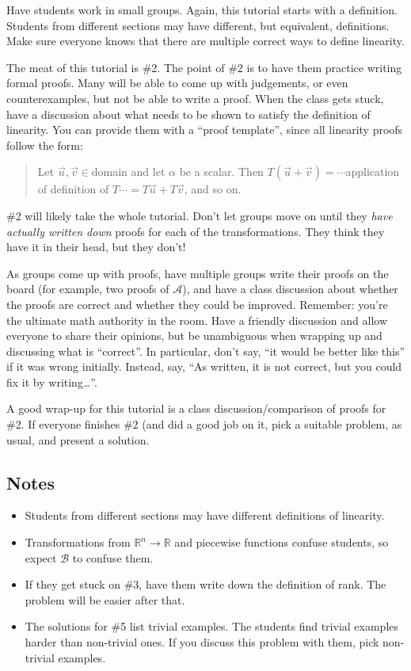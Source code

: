 \documentclass[red]{tutorial}
\newcommand{\R}{\mathbb{R}}
\theoremstyle{definition}
\theoremstyle{theorem}
\begin{document}
\begin{instructions}
	Have students work in small groups. Again, this tutorial starts with a definition. Students from
		different sections may have different, but equivalent, definitions. Make sure everyone
		knows that there are multiple correct ways to define linearity.

	The meat of this tutorial is \#2. The point of \#2 is to have them practice writing formal proofs.
		Many will be able to come up with judgements, or even counterexamples, but not be able to write
		a proof. When the class gets stuck, have a discussion about what needs to be shown
		to satisfy the definition of linearity. You can provide them with a ``proof template'', since
		all linearity proofs follow the form:
		\begin{quote}
			Let $\vec u,\vec v\in$domain and let $\alpha$ be a scalar. Then $T(\vec u+\vec v)=\cdots$application
			of definition of $T$$\cdots=T\vec u+T\vec v$, and so on.
		\end{quote}

	\#2 will likely take the whole tutorial. Don't let groups move on until they \emph{have actually written down}
		proofs for each of the transformations. They think they have it in their head, but they don't!

		As groups come up with proofs, have multiple groups write their proofs on the board (for example,
		two proofs of $\mathcal A$), and have a class discussion about whether the proofs are correct and
		whether they could be improved. Remember: you're the ultimate math authority in the room. Have a
		friendly discussion and allow everyone to share their opinions, but be unambiguous when wrapping up and discussing
		what is ``correct''. In particular, don't say, ``it would be better like this'' if it was wrong initially. Instead,
		say, ``As written, it is not correct, but you could fix it by writing\ldots''.
	
	A good wrap-up for this tutorial is a class discussion/comparison of proofs for \#2. If everyone finishes \#2 (and
	did a good job on it, pick a suitable problem, as usual, and present a solution.

\subsection*{Notes}
	\begin{itemize}
		\item Students from different sections may have different definitions of linearity.
		\item Transformations from $\R^n\to \R$ and piecewise functions confuse students, so
			expect $\mathcal B$ to confuse them.
		\item If they get stuck on \#3, have them write down the definition of rank. The problem
			will be easier after that.
		\item The solutions for \#5 list trivial examples. The students find trivial examples
			harder than non-trivial ones. If you discuss this problem with them, pick non-trivial examples.
	\end{itemize}
	\end{instructions}
\end{document}
